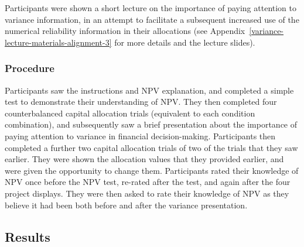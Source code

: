 \documentclass[a4paper, nobind, dvipsnames]{templates/ociamthesis}
\theoremstyle{definition}
\theoremstyle{definition}
\theoremstyle{definition}
\theoremstyle{definition}
\theoremstyle{remark}
\begin{document}
Participants were shown a short lecture on the importance of paying attention to
variance information, in an attempt to facilitate a subsequent increased use of
the numerical reliability information in their allocations (see
Appendix~\ref{variance-lecture-materials-alignment-3} for more details and the
lecture slides).

\hypertarget{procedure-alignment-3}{%
\subsubsection{Procedure}\label{procedure-alignment-3}}

Participants saw the instructions and NPV explanation, and completed a simple
test to demonstrate their understanding of NPV. They then completed four
counterbalanced capital allocation trials (equivalent to each condition
combination), and subsequently saw a brief presentation about the importance of
paying attention to variance in financial decision-making. Participants then
completed a further two capital allocation trials of two of the trials that they
saw earlier. They were shown the allocation values that they provided earlier,
and were given the opportunity to change them. Participants rated their
knowledge of NPV once before the NPV test, re-rated after the test, and again
after the four project displays. They were then asked to rate their knowledge of
NPV as they believe it had been both before and after the variance presentation.

\hypertarget{results-alignment-2}{%
\subsection{Results}\label{results-alignment-2}}
\end{document}

